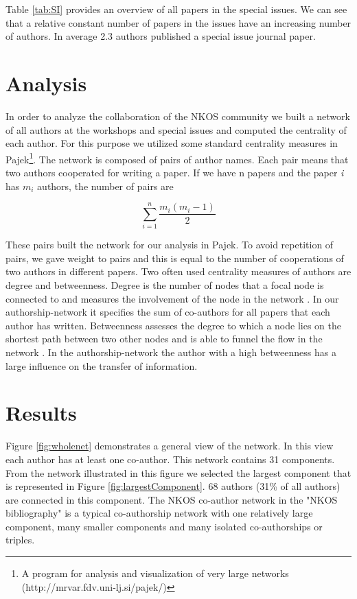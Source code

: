 \documentclass[runningheads,a4paper]{llncs}
\begin{document}
Table \ref{tab:SI} provides an overview of all papers in the special issues. We can see that a relative constant number of papers in the issues have an increasing number of authors. In average 2.3 authors published a special issue journal paper.

\section{Analysis}\label{analysis}

In order to analyze the collaboration of the NKOS community we built a network of all authors at the workshops and special issues and computed the centrality of each author. For this purpose we utilized some standard centrality measures in Pajek\footnote{A program for analysis and visualization of very large networks (http://mrvar.fdv.uni-lj.si/pajek/)}. The network is composed of pairs of author names. Each pair means that two authors cooperated for writing a paper. If we have n papers and the paper \textit{i} has $m_i$ authors, the number of pairs are 

\begin{equation}\sum\limits_{i=1}^n \frac{m_i(m_i-1)}{2}\end{equation}

These pairs built the network for our analysis in Pajek. To avoid repetition of pairs, we gave weight to pairs and this is equal to the number of cooperations of two authors in different papers. 
Two often used centrality measures of authors are degree and betweenness. Degree is the number of nodes that a focal node is connected to and measures the involvement of the node in the network \cite{Opsahl2010}. In our authorship-network it specifies the sum of co-authors for all papers that each author has written. Betweenness assesses the degree to which a node lies on the shortest path between two other nodes and is able to funnel the flow in the network \cite{Opsahl2010}. In the authorship-network the author with a high betweenness has a large influence on the transfer of information. 

\section{Results}\label{results}

Figure \ref{fig:wholenet} demonstrates a general view of the network. In this view each author has at least one co-author. This network contains 31 components. From the network illustrated in this figure we selected the largest component that is represented in Figure \ref{fig:largestComponent}. 68 authors (31\% of all authors) are connected in this component.  The NKOS co-author network in the "NKOS bibliography" is a typical co-authorship network with one relatively large component, many smaller components and many isolated co-authorships or triples.
\end{document}
